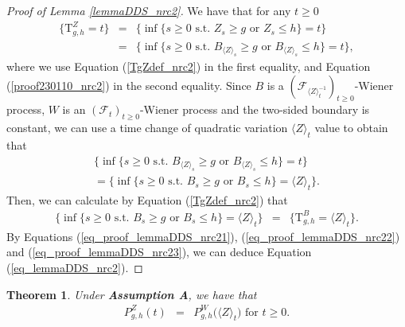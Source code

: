 \documentclass[aop]{imsart}
\theoremstyle{plain}
\newtheorem{theorem}{Theorem}[section]
\theoremstyle{remark}
\newcommand{\Tau}{\mathrm{T}}
\begin{document}
\begin{proof}[Proof of Lemma \ref{lemmaDDS_nrc2}]
We have that for any $t \geq 0$
\begin{eqnarray}
\nonumber \big\{ \Tau_{g,h}^Z =t \big\} 
& = & \big\{ \inf \{s \geq 0 \text{ s.t. } Z_s \geq g \text{ or } Z_s \leq h\} = t \big\}\\ \label{eq_proof_lemmaDDS_nrc21} 
& = & \big\{ \inf \{s \geq 0\text{ s.t. } B_{\langle Z\rangle_{s}} \geq g \text{ or } B_{\langle Z\rangle_{s}} \leq h\} = t \big\},
\end{eqnarray}
where we use Equation (\ref{TgZdef_nrc2}) in the first equality, and Equation (\ref{proof230110_nrc2}) in the second equality. Since $B$ is a $({\mathcal {F}}_{\langle Z\rangle_{t}^{-1}})_{t\geq 0}$-Wiener process, $W$ is an $({\mathcal {F}}_{t})_{t\geq 0}$-Wiener process and the two-sided boundary is constant, we can use a time change of quadratic variation $\langle Z\rangle_t$ value to obtain that
\begin{eqnarray}
\label{eq_proof_lemmaDDS_nrc22} \big\{ \inf \{s \geq 0\text{ s.t. } B_{\langle Z\rangle_{s}} \geq g \text{ or } B_{\langle Z\rangle_{s}} \leq h\} = t \big\} \\ \nonumber = \big\{\inf \{s \geq 0 \text{ s.t. } B_s \geq g \text{ or } B_{s} \leq h \} = \langle Z\rangle_t \big\}.
\end{eqnarray}
Then, we can calculate by Equation (\ref{TgZdef_nrc2}) that
\begin{eqnarray}
\label{eq_proof_lemmaDDS_nrc23} \big\{\inf \{s \geq 0 \text{ s.t. } B_s \geq g \text{ or } B_{s} \leq h \} = \langle Z\rangle_t \big\} & = & \big\{ \Tau^B_{g,h} = \langle Z\rangle_t \big\}. 
\end{eqnarray}
By Equations (\ref{eq_proof_lemmaDDS_nrc21}), (\ref{eq_proof_lemmaDDS_nrc22}) and (\ref{eq_proof_lemmaDDS_nrc23}), we can deduce Equation (\ref{eq_lemmaDDS_nrc2}).
\end{proof}
\begin{theorem}
\label{theorem_nrc2}
Under \textbf{Assumption A}, we have that
\begin{eqnarray}
\label{eq_theorem_nrc2}
P_{g,h}^Z (t) & = & P_{g,h}^W \big(\langle Z\rangle_{t}\big) \text{ for } t \geq 0.
\end{eqnarray}
\end{theorem}
\end{document}
